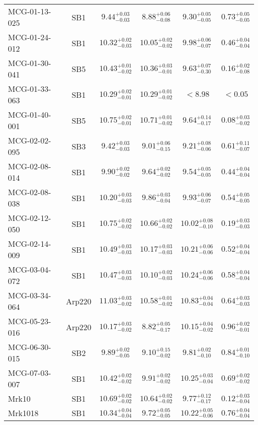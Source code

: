 \documentclass[onecolumn]{mn2e}
\begin{document}
{\begin{center}
\begin{longtable}{lccccc}
MCG-01-13-025 & SB1 & $9.44_{-0.03}^{+0.03}$ & $8.88_{-0.08}^{+0.06}$ & $9.30_{-0.05}^{+0.05}$ &$0.73_{-0.05}^{+0.05}$ \\
MCG-01-24-012 & SB1 & $10.32_{-0.03}^{+0.02}$ & $10.05_{-0.02}^{+0.02}$ & $9.98_{-0.07}^{+0.06}$ &$0.46_{-0.04}^{+0.04}$ \\
MCG-01-30-041 & SB5 & $10.43_{-0.02}^{+0.01}$ & $10.36_{-0.01}^{+0.03}$ & $9.63_{-0.30}^{+0.07}$ &$0.16_{-0.08}^{+0.02}$ \\
MCG-01-33-063 & SB1 & $10.29_{-0.01}^{+0.02}$ & $10.29_{-0.02}^{+0.01}$ & $<8.98$ &$<0.05$ \\
MCG-01-40-001 & SB5 & $10.75_{-0.01}^{+0.02}$ & $10.71_{-0.02}^{+0.01}$ & $9.64_{-0.17}^{+0.14}$ &$0.08_{-0.02}^{+0.03}$ \\
MCG-02-02-095 & SB3 & $9.42_{-0.03}^{+0.03}$ & $9.01_{-0.15}^{+0.06}$ & $9.21_{-0.06}^{+0.08}$ &$0.61_{-0.07}^{+0.11}$ \\
MCG-02-08-014 & SB1 & $9.90_{-0.02}^{+0.02}$ & $9.64_{-0.02}^{+0.02}$ & $9.54_{-0.05}^{+0.05}$ &$0.44_{-0.04}^{+0.04}$ \\
MCG-02-08-038 & SB1 & $10.20_{-0.03}^{+0.03}$ & $9.86_{-0.04}^{+0.03}$ & $9.93_{-0.07}^{+0.06}$ &$0.54_{-0.05}^{+0.05}$ \\
MCG-02-12-050 & SB1 & $10.75_{-0.02}^{+0.02}$ & $10.66_{-0.02}^{+0.02}$ & $10.02_{-0.10}^{+0.08}$ &$0.19_{-0.03}^{+0.03}$ \\
MCG-02-14-009 & SB1 & $10.49_{-0.03}^{+0.03}$ & $10.17_{-0.03}^{+0.03}$ & $10.21_{-0.06}^{+0.06}$ &$0.52_{-0.04}^{+0.04}$ \\
MCG-03-04-072 & SB1 & $10.47_{-0.03}^{+0.03}$ & $10.10_{-0.03}^{+0.02}$ & $10.24_{-0.06}^{+0.06}$ &$0.58_{-0.04}^{+0.04}$ \\
MCG-03-34-064 & Arp220 & $11.03_{-0.02}^{+0.03}$ & $10.58_{-0.02}^{+0.01}$ & $10.83_{-0.04}^{+0.04}$ &$0.64_{-0.03}^{+0.03}$ \\
MCG-05-23-016 & Arp220 & $10.17_{-0.02}^{+0.03}$ & $8.82_{-0.17}^{+0.05}$ & $10.15_{-0.02}^{+0.04}$ &$0.96_{-0.01}^{+0.02}$ \\
MCG-06-30-015 & SB2 & $9.89_{-0.05}^{+0.02}$ & $9.10_{-0.02}^{+0.15}$ & $9.81_{-0.10}^{+0.02}$ &$0.84_{-0.10}^{+0.01}$ \\
MCG-07-03-007 & SB1 & $10.42_{-0.02}^{+0.02}$ & $9.91_{-0.02}^{+0.02}$ & $10.25_{-0.04}^{+0.03}$ &$0.69_{-0.02}^{+0.02}$ \\
Mrk10 & SB1 & $10.69_{-0.02}^{+0.02}$ & $10.64_{-0.02}^{+0.02}$ & $9.77_{-0.17}^{+0.12}$ &$0.12_{-0.04}^{+0.03}$ \\
Mrk1018 & SB1 & $10.34_{-0.04}^{+0.04}$ & $9.72_{-0.05}^{+0.05}$ & $10.22_{-0.06}^{+0.05}$ &$0.76_{-0.04}^{+0.04}$ \\

\end{longtable}
\end{center}}
\end{document}

